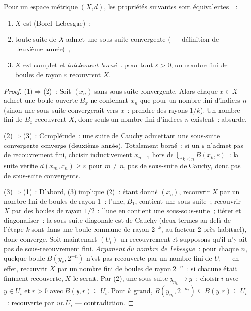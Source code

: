 \begin{theorem}
\label{thm:b3:topology:metriccompact}
Pour un espace métrique $(X, d)$, les propriétés suivantes
sont équivalentes~~:
\begin{enumerate}
  \item $X$ est  (Borel--Lebesgue)~;
  \item toute suite de $X$ admet une sous-suite convergente
        ( --- définition de deuxième
        année)~;
  \item $X$ est complet et \emph{totalement borné}~: pour tout
        $\varepsilon > 0$, un nombre fini de boules de rayon
        $\varepsilon$ recouvrent $X$.
\end{enumerate}
\end{theorem}

\begin{proof}
(1)$\Rightarrow$(2)~: Soit $(x_n)$ sans sous-suite convergente.
Alors chaque $x \in X$ admet une boule ouverte $B_x$ ne
contenant $x_n$ que pour un nombre fini d'indices $n$ (sinon
une sous-suite convergerait vers $x$~: prendre des rayons
$1/k$). Un nombre fini de $B_x$ recouvrent $X$, donc seuls un
nombre fini d'indices $n$ existent~: absurde.

(2)$\Rightarrow$(3)~: Complétude~: une suite de Cauchy admettant
une sous-suite convergente converge (deuxième année).
Totalement borné~: si un $\varepsilon$ n'admet pas de
recouvrement fini, choisir inductivement $x_{n+1}$ hors de
$\bigcup_{k\leq n} B(x_k, \varepsilon)$~: la suite vérifie
$d(x_m, x_n) \geq \varepsilon$ pour $m \neq n$, pas de
sous-suite de Cauchy, donc pas de sous-suite convergente.

(3)$\Rightarrow$(1)~: D'abord, (3) implique (2)~: étant donné
$(x_n)$, recouvrir $X$ par un nombre fini de boules de rayon
$1$~: l'une, $B_1$, contient une sous-suite~; recouvrir $X$ par
des boules de rayon $1/2$~: l'une en contient une
sous-sous-suite~; itérer et diagonaliser~: la sous-suite
diagonale est de Cauchy (deux termes au-delà de l'étape $k$
sont dans une boule commune de rayon $2^{-k}$, au facteur $2$
près habituel), donc converge. Soit maintenant $(U_i)$ un
recouvrement  et supposons qu'il n'y ait pas de
sous-recouvrement fini. \emph{Argument du nombre de Lebesgue}~:
pour chaque $n$, quelque boule $B(y_n, 2^{-n})$ n'est pas
recouverte par un nombre fini de $U_i$ --- en effet, recouvrir
$X$ par un nombre fini de boules de rayon $2^{-n}$~; si
chacune était finiment recouverte, $X$ le serait. Par (2), une
sous-suite $y_{n_k} \to y$~; choisir $i$ avec $y \in U_i$ et
$r > 0$ avec $B(y, r) \subseteq U_i$. Pour $k$ grand,
$B(y_{n_k}, 2^{-n_k}) \subseteq B(y, r) \subseteq U_i$~:
recouverte par \emph{un} $U_i$ --- contradiction.
\end{proof}

